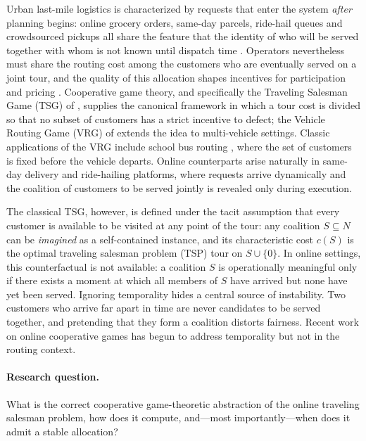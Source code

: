 \documentclass[11pt]{article}
\theoremstyle{plain}
\theoremstyle{definition}
\theoremstyle{remark}
\begin{document}
Urban last-mile logistics is characterized by requests that enter the system \emph{after} planning begins: online grocery orders, same-day parcels, ride-hail queues and crowdsourced pickups all share the feature that the identity of who will be served together with whom is not known until dispatch time \citep{pillac2013review,ausiello2001oltsp}. Operators nevertheless must share the routing cost among the customers who are eventually served on a joint tour, and the quality of this allocation shapes incentives for participation and pricing \citep{guajardo2016review}. Cooperative game theory, and specifically the Traveling Salesman Game (TSG) of \citet{potters1992tsg}, supplies the canonical framework in which a tour cost is divided so that no subset of customers has a strict incentive to defect; the Vehicle Routing Game (VRG) of \citet{gothe1996vrg,engevall2004heterogeneous} extends the idea to multi-vehicle settings. Classic applications of the VRG include school bus routing \citep{park2012schoolbus}, where the set of customers is fixed before the vehicle departs. Online counterparts arise naturally in same-day delivery and ride-hailing platforms, where requests arrive dynamically and the coalition of customers to be served jointly is revealed only during execution.

The classical TSG, however, is defined under the tacit assumption that every customer is available to be visited at any point of the tour: any coalition $S\subseteq N$ can be \emph{imagined} as a self-contained instance, and its characteristic cost $c(S)$ is the optimal traveling salesman problem (TSP) tour on $S\cup\{0\}$. In online settings, this counterfactual is not available: a coalition $S$ is operationally meaningful only if there exists a moment at which all members of $S$ have arrived but none have yet been served. Ignoring temporality hides a central source of instability. Two customers who arrive far apart in time are never candidates to be served together, and pretending that they form a coalition distorts fairness. Recent work on online cooperative games \citep{ge2024incentives,aziz2025participation,goyal2025temporal} has begun to address temporality but not in the routing context.

\paragraph{Research question.} What is the correct cooperative game-theoretic abstraction of the online traveling salesman problem, how does it compute, and---most importantly---when does it admit a stable allocation?
\end{document}
